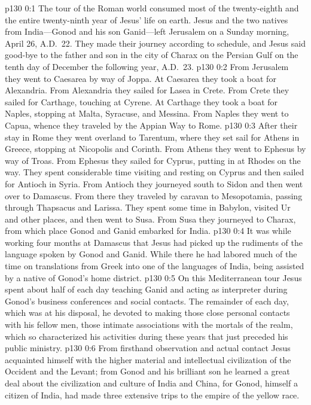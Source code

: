 \author{Midwayer Commission}
\vs p130 0:1 The tour of the Roman world consumed most of the twenty\hyp{}eighth and the entire twenty\hyp{}ninth year of Jesus’ life on earth. Jesus and the two natives from India---Gonod and his son Ganid---left Jerusalem on a Sunday morning, April 26, A.D.~22. They made their journey according to schedule, and Jesus said good\hyp{}bye to the father and son in the city of Charax on the Persian Gulf on the tenth day of December the following year, A.D.~23.
\pc \vs p130 0:2 From Jerusalem they went to Caesarea by way of Joppa. At Caesarea they took a boat for Alexandria. From Alexandria they sailed for Lasea in Crete. From Crete they sailed for Carthage, touching at Cyrene. At Carthage they took a boat for Naples, stopping at Malta, Syracuse, and Messina. From Naples they went to Capua, whence they traveled by the Appian Way to Rome.
\vs p130 0:3 After their stay in Rome they went overland to Tarentum, where they set sail for Athens in Greece, stopping at Nicopolis and Corinth. From Athens they went to Ephesus by way of Troas. From Ephesus they sailed for Cyprus, putting in at Rhodes on the way. They spent considerable time visiting and resting on Cyprus and then sailed for Antioch in Syria. From Antioch they journeyed south to Sidon and then went over to Damascus. From there they traveled by caravan to Mesopotamia, passing through Thapsacus and Larissa. They spent some time in Babylon, visited Ur and other places, and then went to Susa. From Susa they journeyed to Charax, from which place Gonod and Ganid embarked for India.
\pc \vs p130 0:4 It was while working four months at Damascus that Jesus had picked up the rudiments of the language spoken by Gonod and Ganid. While there he had labored much of the time on translations from Greek into one of the languages of India, being assisted by a native of Gonod’s home district.
\pc \vs p130 0:5 On this Mediterranean tour Jesus spent about half of each day teaching Ganid and acting as interpreter during Gonod’s business conferences and social contacts. The remainder of each day, which was at his disposal, he devoted to making those close personal contacts with his fellow men, those intimate associations with the mortals of the realm, which so characterized his activities during these years that just preceded his public ministry.
\vs p130 0:6 From firsthand observation and actual contact Jesus acquainted himself with the higher material and intellectual civilization of the Occident and the Levant; from Gonod and his brilliant son he learned a great deal about the civilization and culture of India and China, for Gonod, himself a citizen of India, had made three extensive trips to the empire of the yellow race.\plusone
